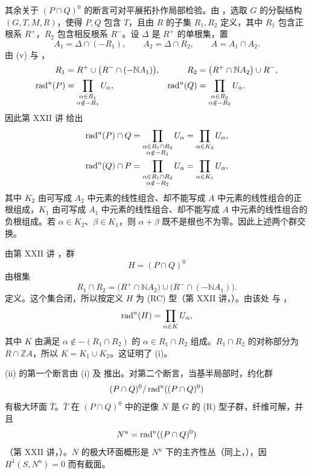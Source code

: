 其余关于 \((P\cap Q)^0\) 的断言可对平展拓扑作局部检验。由 \textup{}，选取 \(G\) 的分裂结构 \((G,T,M,R)\)，使得 \(P,Q\) 包含 \(T\)，且由 \(R\) 的子集 \(R_1,R_2\) 定义，其中 \(R_1\) 包含正根系 \(R^+\)，\(R_2\) 包含相反根系 \(R^-\)。设 \(\Delta\) 是 \(R^+\) 的单根集，置
\[
 A_1=\Delta\cap(-R_1),\qquad
 A_2=\Delta\cap R_2,\qquad
 A=A_1\cap A_2.
\]
由 \textup{(v)} 与 ，
\[
\begin{aligned}
 R_1&=R^+\cup\bigl(R^-\cap(-\mathbb N A_1)\bigr),&
 R_2&=\bigl(R^+\cap\mathbb N A_2\bigr)\cup R^-,\\
 \operatorname{rad}^u(P)&=
   \prod_{\substack{\alpha\in R_1\\\alpha\notin-R_1}}U_\alpha,&
 \operatorname{rad}^u(Q)&=
   \prod_{\substack{\alpha\in R_2\\\alpha\notin-R_2}}U_\alpha.
\end{aligned}
\]
因此第 XXII 讲  给出
\[
\begin{aligned}
 \operatorname{rad}^u(P)\cap Q
  &=
  \prod_{\substack{\alpha\in R_1\cap R_2\\\alpha\notin-R_1}}U_\alpha
  =\prod_{\alpha\in K_2}U_\alpha,\\
 \operatorname{rad}^u(Q)\cap P
  &=
  \prod_{\substack{\alpha\in R_1\cap R_2\\\alpha\notin-R_2}}U_\alpha
  =\prod_{\alpha\in K_1}U_\alpha,
\end{aligned}
\]
其中 \(K_2\) 由可写成 \(A_2\) 中元素的线性组合、却不能写成 \(A\) 中元素的线性组合的正根组成，\(K_1\) 由可写成 \(A_1\) 中元素的线性组合、却不能写成 \(A\) 中元素的线性组合的负根组成。若 \(\alpha\in K_2\)、\(\beta\in K_1\)，则 \(\alpha+\beta\) 既不是根也不为零。因此上述两个群交换。

由第 XXII 讲 ，群
\[
 H=(P\cap Q)^0
\]
由根集
\[
 R_1\cap R_2
 =
 \bigl(R^+\cap\mathbb N A_2\bigr)
 \cup
 \bigl(R^-\cap(-\mathbb N A_1)\bigr).
\]
定义。这个集合闭，所以按定义 \(H\) 为 \textup{(RC)} 型（第 XXII 讲，）。由该处  与 ，
\[
 \operatorname{rad}^u(H)=\prod_{\alpha\in K}U_\alpha,
\]
其中 \(K\) 由满足 \(\alpha\notin-(R_1\cap R_2)\) 的 \(\alpha\in R_1\cap R_2\) 组成。\(R_1\cap R_2\) 的对称部分为 \(R\cap\mathbb ZA\)，所以 \(K=K_1\cup K_2\)。这证明了 (i)。

(ii) 的第一个断言由 (i) 及  推出。对第二个断言，当基半局部时，约化群
\[
 (P\cap Q)^0/\operatorname{rad}^u((P\cap Q)^0)
\]
有极大环面 \(\bar T\)。\(\bar T\) 在 \((P\cap Q)^0\) 中的逆像 \(N\) 是 \(G\) 的 \textup{(R)} 型子群，纤维可解，并且
\[
 N^u=\operatorname{rad}^u((P\cap Q)^0)
\]
（第 XXII 讲，）。\(N\) 的极大环面概形是 \(N^u\) 下的主齐性丛（同上，），因 \(H^1(S,N^u)=0\) 而有截面。
\SGAQED

